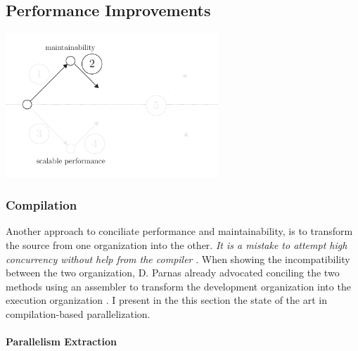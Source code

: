 
\subsection{Performance Improvements}

\begin{center}
\includegraphics[width=0.6\textwidth]{../ressources/state-of-the-art-2.pdf}
\end{center}

\subsubsection{Compilation}


Another approach to conciliate performance and maintainability, is to transform the source from one organization into the other.
\textit{It is a mistake to attempt high concurrency without help from the compiler} \cite{Behren2003}.
When showing the incompatibility between the two organization, D. Parnas already advocated conciling the two methods using an assembler to transform the development organization into the execution organization \cite{Parnas1972}.
I present in the this section the state of the art in compilation-based parallelization.


\paragraph{Parallelism Extraction}

